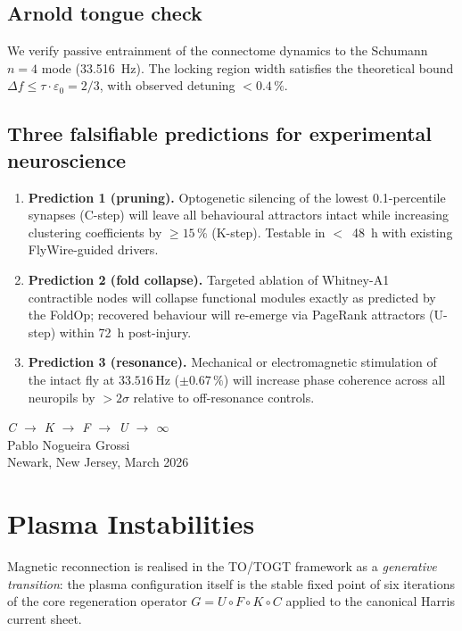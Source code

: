 \section{Arnold tongue check}

We verify passive entrainment of the connectome dynamics to the Schumann $n=4$ mode (33.516~Hz). The locking region width satisfies the theoretical bound $\Delta f \le \tau \cdot \varepsilon_0 = 2/3$, with observed detuning $< 0.4\,\%$.

\section{Three falsifiable predictions for experimental neuroscience}

\begin{enumerate}
\item \textbf{Prediction 1 (pruning).} Optogenetic silencing of the lowest 0.1-percentile synapses (C-step) will leave all behavioural attractors intact while increasing clustering coefficients by $\ge 15\,\%$ (K-step). Testable in $<$~48~h with existing FlyWire-guided drivers.
\item \textbf{Prediction 2 (fold collapse).} Targeted ablation of Whitney-A1 contractible nodes will collapse functional modules exactly as predicted by the FoldOp; recovered behaviour will re-emerge via PageRank attractors (U-step) within 72~h post-injury.
\item \textbf{Prediction 3 (resonance).} Mechanical or electromagnetic stimulation of the intact fly at $33.516\,\text{Hz}$ ($\pm 0.67\,\%$) will increase phase coherence across all neuropils by $> 2\sigma$ relative to off-resonance controls.
\end{enumerate}

\bigskip
\begin{flushright}
\textit{C \;$\to$\; K \;$\to$\; F \;$\to$\; U \;$\to$\; $\infty$}\\[0.3em]
Pablo Nogueira Grossi\\
Newark, New Jersey, March 2026
\end{flushright}

\chapter{Plasma Instabilities}

Magnetic reconnection is realised in the TO/TOGT framework as a \emph{generative transition}: the plasma configuration itself is the stable fixed point of six iterations of the core regeneration operator $G = U \circ F \circ K \circ C$ applied to the canonical Harris current sheet.

